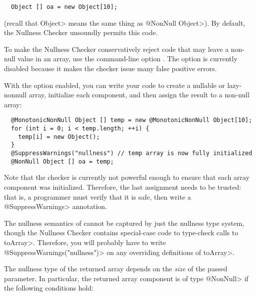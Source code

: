 \begin{Verbatim}
  Object [] oa = new Object[10];
\end{Verbatim}

\noindent
(recall that \<Object> means the same thing as \<@NonNull Object>).
By default, the Nullness Checker unsoundly permits this code.

To make the Nullness Checker conservatively reject code that may leave a
non-null value in an array, use the command-line option
.  The option is currently disabled
because it makes the checker issue many false positive errors.

With the option enabled, you can write your code to create a nullable or
lazy-nonnull array, initialize
each component, and then assign the result to a non-null array:

\begin{Verbatim}
  @MonotonicNonNull Object [] temp = new @MonotonicNonNull Object[10];
  for (int i = 0; i < temp.length; ++i) {
    temp[i] = new Object();
  }
  @SuppressWarnings("nullness") // temp array is now fully initialized
  @NonNull Object [] oa = temp;
\end{Verbatim}

Note that the checker is currently not powerful enough to ensure that
each array component was initialized. Therefore, the last assignment
needs to be trusted:  that is, a programmer must verify that it is safe,
then write a \<@SuppressWarnings> annotation.





The nullness semantics of
cannot be captured by just the nullness type system, though the Nullness
Checker contains special-case code to type-check calls to \<toArray>.
Therefore, you will probably have to write \<@SuppressWarnings("nullness")>
on any overriding definitions of \<toArray>.

The nullness type of the
returned array depends on the \emph{size} of the passed parameter. In particular, the
returned array component is of type \<@NonNull> if the following conditions
hold:

